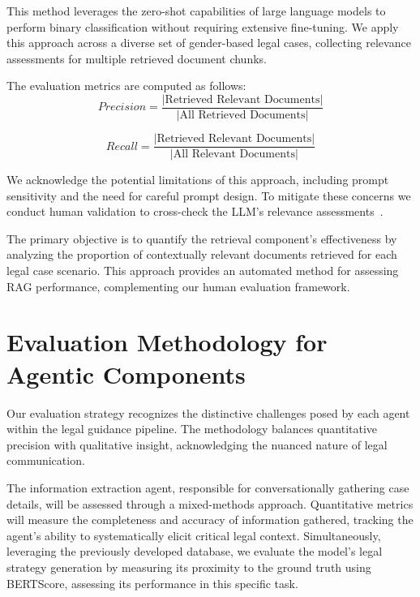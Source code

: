 This method leverages the zero-shot capabilities of large language 
models to perform binary classification without requiring extensive 
fine-tuning. We apply this approach across a diverse set of gender-based 
legal cases, collecting relevance assessments for multiple retrieved 
document chunks.

The evaluation metrics are computed as follows:
\begin{equation}
Precision = \frac{|\text{Retrieved Relevant Documents}|}{|\text{All Retrieved Documents}|}
\end{equation}

\begin{equation}
Recall = \frac{|\text{Retrieved Relevant Documents}|}{|\text{All Relevant Documents}|}
\end{equation}

We acknowledge the potential limitations of this approach, including 
prompt sensitivity and the need for careful prompt design. To mitigate 
these concerns we conduct human validation to cross-check the LLM's relevance assessments~\cite{es2023ragasautomatedevaluationretrieval}.

The primary objective is to quantify the retrieval component's 
effectiveness by analyzing the proportion of contextually relevant 
documents retrieved for each legal case scenario. This approach provides 
an automated method for assessing RAG performance, complementing our 
human evaluation framework.

\section{Evaluation Methodology for Agentic Components}
Our evaluation strategy recognizes the distinctive challenges posed by 
each agent within the legal guidance pipeline. The methodology balances 
quantitative precision with qualitative insight, acknowledging the nuanced 
nature of legal communication.

The information extraction agent, responsible for conversationally 
gathering case details, will be assessed through a mixed-methods approach. 
Quantitative metrics will measure the completeness and accuracy of 
information gathered, tracking the agent's ability to systematically 
elicit critical legal context. Simultaneously, leveraging the previously 
developed database, we evaluate the model’s legal strategy generation by 
measuring its proximity to the ground truth using BERTScore, assessing 
its performance in this specific task.

